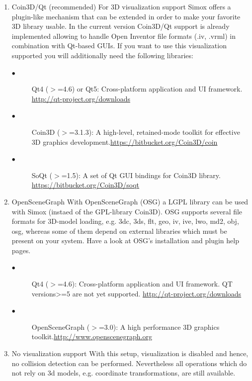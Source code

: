 \documentclass{book}
\begin{document}
\begin{enumerate}[label={\arabic{MyCounter}\addtocounter{MyCounter}{1}}]
\item Coin3D/Qt (recommended) For 3D visualization support Simox offers a plugin-like mechanism that can be extended in order to make your favorite 3D library usable. In the current version Coin3D/Qt support is already implemented allowing to handle Open Inventor file formats (.iv, .vrml) in combination with Qt-based GUIs. If you want to use this visualization supported you will additionally need the following libraries:
\begin{description}
\item[$\bullet$ ] Qt4 ($>$=4.6) or Qt5: Cross-platform application and UI framework.\newline 
\hyperref[qt]{http://qt-project.org/downloads} 
\item[$\bullet$ ] Coin3D ($>$=3.1.3): A high-level, retained-mode toolkit for effective 3D graphics development.\newline  \hyperref[coin3d]{https://bitbucket.org/Coin3D/coin} 
\item[$\bullet$ ] SoQt ($>$=1.5): A set of Qt GUI bindings for Coin3D library. \newline 
\hyperref[SoQt]{https://bitbucket.org/Coin3D/soqt} 
\end{description} 
\item OpenSceneGraph With OpenSceneGraph (OSG) a LGPL library can be used with Simox (instaed of the GPL-library Coin3D). OSG supports several file formats for 3D-model loading, e.g. 3dc, 3ds, flt, geo, iv, ive, lwo, md2, obj, osg, whereas some of them depend on external libraries which must be present on your system. Have a look at OSG's installation and plugin help pages. 
\begin{description}
\item[$\bullet$ ] Qt4 ($>$=4.6): Cross-platform application and UI framework. QT versions>=5 are not yet supported.\newline 
\hyperref[qt]{http://qt-project.org/downloads} 
\item[$\bullet$ ] OpenSceneGraph ($>$=3.0): A high performance 3D graphics toolkit.\newline  \hyperref[openscene]{http://www.openscenegraph.org} 
\end{description} 
\item No visualization support With this setup, visualization is disabled and hence, no collision detection can be performed. Nevertheless all operations which do not rely on 3d models, e.g. coordinate transformations, are still available. 
\end{enumerate}
\end{document}
